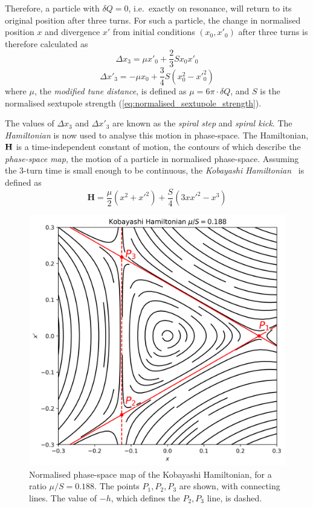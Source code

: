 \documentclass[11pt]{report}
\begin{document}
Therefore, a particle with $\delta Q=0$, i.e.\ exactly on resonance, will return to its original position after three turns. For such a particle, the change in normalised position $x$ and divergence $x'$ from initial conditions $(x_0, x'_0)$ after three turns is therefore calculated as
\begin{equation}
  \Delta x_3 = \mu x'_0 + \frac 23 S x_0x'_0
\end{equation}
\begin{equation}
  \Delta x'_3 = -\mu x_0 + \frac 34 S (x_0^2-x'^2_0)
\end{equation}
where $\mu$, the \textit{modified tune distance}, is defined as $\mu = 6\pi\cdot\delta Q$, and $S$ is the normalised sextupole strength (\autoref{eq:normalised_sextupole_strength}).

The values of $\Delta x_3$ and $\Delta x'_3$ are known as the \textit{spiral step} and \textit{spiral kick}.
The \textit{Hamiltonian} is now used to analyse this motion in phase-space. The Hamiltonian, $\bf H$ is a time-independent constant of motion, the contours of which describe the \textit{phase-space map}, the motion of a particle in normalised phase-space. Assuming the 3-turn time is small enough to be continuous, the \textit{Kobayashi Hamiltonian}~\cite{kobayashi} is defined as
\begin{equation}
  \textbf{H} =\frac\mu 2(x^2+x'^2)+\frac S4(3xx'^2-x^3)
\end{equation}

\begin{figure}
  \centering
  \includegraphics[width=0.6\linewidth]{kobayashi.png}
  \caption{Normalised phase-space map of the Kobayashi Hamiltonian, for a ratio $\mu/S=0.188$. The points $P_1, P_2, P_3$ are shown, with connecting lines. The value of $-h$, which defines the $P_2, P_3$ line, is dashed.}\label{fig:kobayashi}
\end{figure}
\end{document}
